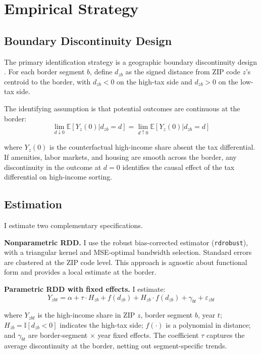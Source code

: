 \documentclass[12pt]{article}
\newcommand{\E}{\mathbb{E}}
\newcommand{\ind}{\mathbb{I}}
\begin{document}
\section{Empirical Strategy}
\label{sec:strategy}

\subsection{Boundary Discontinuity Design}

The primary identification strategy is a geographic boundary discontinuity design \citep{black1999better, bayer2007general, keele2015geographic}. For each border segment $b$, define $d_{zb}$ as the signed distance from ZIP code $z$'s centroid to the border, with $d_{zb} < 0$ on the high-tax side and $d_{zb} > 0$ on the low-tax side.

The identifying assumption is that potential outcomes are continuous at the border:
\begin{equation}
\lim_{d \downarrow 0} \E[Y_z(0) | d_{zb} = d] = \lim_{d \uparrow 0} \E[Y_z(0) | d_{zb} = d]
\end{equation}

\noindent where $Y_z(0)$ is the counterfactual high-income share absent the tax differential. If amenities, labor markets, and housing are smooth across the border, any discontinuity in the outcome at $d = 0$ identifies the causal effect of the tax differential on high-income sorting.

\subsection{Estimation}

I estimate two complementary specifications.

\textbf{Nonparametric RDD.} I use the \citet{calonico2014robust} robust bias-corrected estimator (\texttt{rdrobust}), with a triangular kernel and MSE-optimal bandwidth selection. Standard errors are clustered at the ZIP code level. This approach is agnostic about functional form and provides a local estimate at the border.

\textbf{Parametric RDD with fixed effects.} I estimate:
\begin{equation}
Y_{zbt} = \alpha + \tau \cdot H_{zb} + f(d_{zb}) + H_{zb} \cdot f(d_{zb}) + \gamma_{bt} + \varepsilon_{zbt}
\label{eq:parametric}
\end{equation}

\noindent where $Y_{zbt}$ is the high-income share in ZIP $z$, border segment $b$, year $t$; $H_{zb} = \ind[d_{zb} < 0]$ indicates the high-tax side; $f(\cdot)$ is a polynomial in distance; and $\gamma_{bt}$ are border-segment $\times$ year fixed effects. The coefficient $\tau$ captures the average discontinuity at the border, netting out segment-specific trends.
\end{document}
